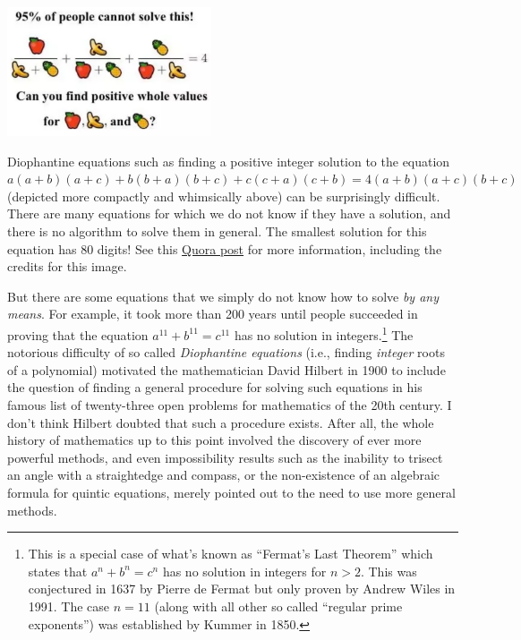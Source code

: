 \begin{marginfigure}
\centering
\includegraphics[width=\linewidth, height=1.5in, keepaspectratio]{../figure/elliptic_curve.png}
\caption{Diophantine equations such as finding a positive integer
solution to the equation
\(a(a+b)(a+c)+b(b+a)(b+c)+c(c+a)(c+b)=4(a+b)(a+c)(b+c)\) (depicted more
compactly and whimsically above) can be surprisingly difficult. There
are many equations for which we do not know if they have a solution, and
there is no algorithm to solve them in general. The smallest solution
for this equation has \(80\) digits! See this
\href{https://www.quora.com/How-do-you-find-the-positive-integer-solutions-to-frac-x-y+z-+-frac-y-z+x-+-frac-z-x+y-4}{Quora
post} for more information, including the credits for this image.}
\label{ellipticcurvefig}
\end{marginfigure}

But there are some equations that we simply do not know how to solve
\emph{by any means}. For example, it took more than 200 years until
people succeeded in proving that the equation
\(a^{11} + b^{11} = c^{11}\) has no solution in integers.\footnote{This
  is a special case of what's known as ``Fermat's Last Theorem'' which
  states that \(a^n + b^n = c^n\) has no solution in integers for
  \(n>2\). This was conjectured in 1637 by Pierre de Fermat but only
  proven by Andrew Wiles in 1991. The case \(n=11\) (along with all
  other so called ``regular prime exponents'') was established by Kummer
  in 1850.} The notorious difficulty of so called \emph{Diophantine
equations} (i.e., finding \emph{integer} roots of a polynomial)
motivated the mathematician David Hilbert in 1900 to include the
question of finding a general procedure for solving such equations in
his famous list of twenty-three open problems for mathematics of the
20th century. I don't think Hilbert doubted that such a procedure
exists. After all, the whole history of mathematics up to this point
involved the discovery of ever more powerful methods, and even
impossibility results such as the inability to trisect an angle with a
straightedge and compass, or the non-existence of an algebraic formula
for quintic equations, merely pointed out to the need to use more
general methods.

